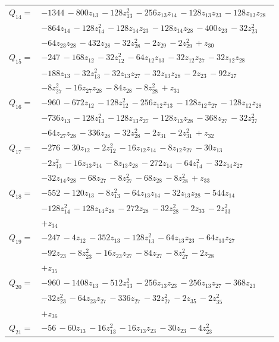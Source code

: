 \begin{longtable}{@{}r p{0.88\linewidth}@{}}
$Q_{14}=$ & $-1344\,-800z_{13}\,-128z_{13}^{2}\,-256z_{13}z_{14}\,-128z_{13}z_{23}\,-128z_{13}z_{28}$\\
 & $-864z_{14}\,-128z_{14}^{2}\,-128z_{14}z_{23}\,-128z_{14}z_{28}\,-400z_{23}\,-32z_{23}^{2}$\\
 & $-64z_{23}z_{28}\,-432z_{28}\,-32z_{28}^{2}\,-2z_{29}\,-2z_{29}^{2}\,+z_{30}$\\[5pt]
$Q_{15}=$ & $-247\,-168z_{12}\,-32z_{12}^{2}\,-64z_{12}z_{13}\,-32z_{12}z_{27}\,-32z_{12}z_{28}$\\
 & $-188z_{13}\,-32z_{13}^{2}\,-32z_{13}z_{27}\,-32z_{13}z_{28}\,-2z_{23}\,-92z_{27}$\\
 & $-8z_{27}^{2}\,-16z_{27}z_{28}\,-84z_{28}\,-8z_{28}^{2}\,+z_{31}$\\[5pt]
$Q_{16}=$ & $-960\,-672z_{12}\,-128z_{12}^{2}\,-256z_{12}z_{13}\,-128z_{12}z_{27}\,-128z_{12}z_{28}$\\
 & $-736z_{13}\,-128z_{13}^{2}\,-128z_{13}z_{27}\,-128z_{13}z_{28}\,-368z_{27}\,-32z_{27}^{2}$\\
 & $-64z_{27}z_{28}\,-336z_{28}\,-32z_{28}^{2}\,-2z_{31}\,-2z_{31}^{2}\,+z_{32}$\\[5pt]
$Q_{17}=$ & $-276\,-30z_{12}\,-2z_{12}^{2}\,-16z_{12}z_{14}\,-8z_{12}z_{27}\,-30z_{13}$\\
 & $-2z_{13}^{2}\,-16z_{13}z_{14}\,-8z_{13}z_{28}\,-272z_{14}\,-64z_{14}^{2}\,-32z_{14}z_{27}$\\
 & $-32z_{14}z_{28}\,-68z_{27}\,-8z_{27}^{2}\,-68z_{28}\,-8z_{28}^{2}\,+z_{33}$\\[5pt]
$Q_{18}=$ & $-552\,-120z_{13}\,-8z_{13}^{2}\,-64z_{13}z_{14}\,-32z_{13}z_{28}\,-544z_{14}$\\
 & $-128z_{14}^{2}\,-128z_{14}z_{28}\,-272z_{28}\,-32z_{28}^{2}\,-2z_{33}\,-2z_{33}^{2}$\\
 & $+z_{34}$\\[5pt]
$Q_{19}=$ & $-247\,-4z_{12}\,-352z_{13}\,-128z_{13}^{2}\,-64z_{13}z_{23}\,-64z_{13}z_{27}$\\
 & $-92z_{23}\,-8z_{23}^{2}\,-16z_{23}z_{27}\,-84z_{27}\,-8z_{27}^{2}\,-2z_{28}$\\
 & $+z_{35}$\\[5pt]
$Q_{20}=$ & $-960\,-1408z_{13}\,-512z_{13}^{2}\,-256z_{13}z_{23}\,-256z_{13}z_{27}\,-368z_{23}$\\
 & $-32z_{23}^{2}\,-64z_{23}z_{27}\,-336z_{27}\,-32z_{27}^{2}\,-2z_{35}\,-2z_{35}^{2}$\\
 & $+z_{36}$\\[5pt]
$Q_{21}=$ & $-56\,-60z_{13}\,-16z_{13}^{2}\,-16z_{13}z_{23}\,-30z_{23}\,-4z_{23}^{2}$\\

\end{longtable}
